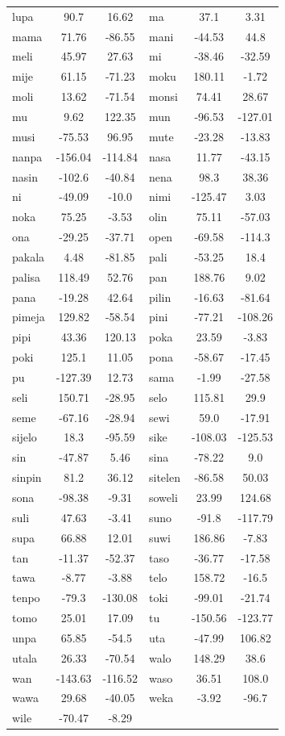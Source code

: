 \documentclass[14pt, a4paper]{extreport}
\begin{document}
\begin{longtable}{lcclcc}
lupa & 90.7 & 16.62 & ma & 37.1 & 3.31 \\
mama & 71.76 & -86.55 & mani & -44.53 & 44.8 \\
meli & 45.97 & 27.63 & mi & -38.46 & -32.59 \\
mije & 61.15 & -71.23 & moku & 180.11 & -1.72 \\
moli & 13.62 & -71.54 & monsi & 74.41 & 28.67 \\
mu & 9.62 & 122.35 & mun & -96.53 & -127.01 \\
musi & -75.53 & 96.95 & mute & -23.28 & -13.83 \\
nanpa & -156.04 & -114.84 & nasa & 11.77 & -43.15 \\
nasin & -102.6 & -40.84 & nena & 98.3 & 38.36 \\
ni & -49.09 & -10.0 & nimi & -125.47 & 3.03 \\
noka & 75.25 & -3.53 & olin & 75.11 & -57.03 \\
ona & -29.25 & -37.71 & open & -69.58 & -114.3 \\
pakala & 4.48 & -81.85 & pali & -53.25 & 18.4 \\
palisa & 118.49 & 52.76 & pan & 188.76 & 9.02 \\
pana & -19.28 & 42.64 & pilin & -16.63 & -81.64 \\
pimeja & 129.82 & -58.54 & pini & -77.21 & -108.26 \\
pipi & 43.36 & 120.13 & poka & 23.59 & -3.83 \\
poki & 125.1 & 11.05 & pona & -58.67 & -17.45 \\
pu & -127.39 & 12.73 & sama & -1.99 & -27.58 \\
seli & 150.71 & -28.95 & selo & 115.81 & 29.9 \\
seme & -67.16 & -28.94 & sewi & 59.0 & -17.91 \\
sijelo & 18.3 & -95.59 & sike & -108.03 & -125.53 \\
sin & -47.87 & 5.46 & sina & -78.22 & 9.0 \\
sinpin & 81.2 & 36.12 & sitelen & -86.58 & 50.03 \\
sona & -98.38 & -9.31 & soweli & 23.99 & 124.68 \\
suli & 47.63 & -3.41 & suno & -91.8 & -117.79 \\
supa & 66.88 & 12.01 & suwi & 186.86 & -7.83 \\
tan & -11.37 & -52.37 & taso & -36.77 & -17.58 \\
tawa & -8.77 & -3.88 & telo & 158.72 & -16.5 \\
tenpo & -79.3 & -130.08 & toki & -99.01 & -21.74 \\
tomo & 25.01 & 17.09 & tu & -150.56 & -123.77 \\
unpa & 65.85 & -54.5 & uta & -47.99 & 106.82 \\
utala & 26.33 & -70.54 & walo & 148.29 & 38.6 \\
wan & -143.63 & -116.52 & waso & 36.51 & 108.0 \\
wawa & 29.68 & -40.05 & weka & -3.92 & -96.7 \\
wile & -70.47 & -8.29 \\
\end{longtable}
\end{document}
